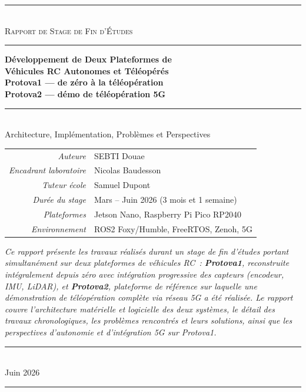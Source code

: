 \documentclass[a4paper,11pt]{article}
\begin{document}
\begin{titlepage}
\thispagestyle{empty}
\begin{center}

\rule{\textwidth}{0.5pt}\\[0.4cm]
{\large\scshape Rapport de Stage de Fin d'Études}\\[0.2cm]
\rule{\textwidth}{0.5pt}

\vspace{2cm}

{\LARGE\bfseries Développement de Deux Plateformes de}\\[0.3cm]
{\LARGE\bfseries Véhicules RC Autonomes et Téléopérés}\\[0.6cm]
{\Large\bfseries Protova1 \textnormal{—} de zéro à la téléopération}\\[0.2cm]
{\Large\bfseries Protova2 \textnormal{—} démo de téléopération 5G}\\[0.4cm]
\rule{0.6\textwidth}{0.3pt}\\[0.4cm]
{\large Architecture, Implémentation, Problèmes et Perspectives}

\vspace{2cm}

\begin{tabular}{rl}
\textit{Auteure}              & SEBTI Douae \\[0.3cm]
\textit{Encadrant laboratoire} & Nicolas Baudesson \\[0.3cm]
\textit{Tuteur école}          & Samuel Dupont \\[0.3cm]
\textit{Durée du stage}        & Mars -- Juin 2026 (3 mois et 1 semaine) \\[0.3cm]
\textit{Plateformes}           & Jetson Nano, Raspberry Pi Pico RP2040 \\[0.3cm]
\textit{Environnement}         & ROS2 Foxy/Humble, FreeRTOS, Zenoh, 5G \\
\end{tabular}

\vspace{1.5cm}

\begin{minipage}{0.88\textwidth}
\small\itshape
Ce rapport présente les travaux réalisés durant un stage de fin d'études portant
simultanément sur deux plateformes de véhicules RC~: \textbf{Protova1}, reconstruite
intégralement depuis zéro avec intégration progressive des capteurs (encodeur, IMU,
LiDAR), et \textbf{Protova2}, plateforme de référence sur laquelle une démonstration de
téléopération complète via réseau 5G a été réalisée. Le rapport couvre l'architecture
matérielle et logicielle des deux systèmes, le détail des travaux chronologiques, les
problèmes rencontrés et leurs solutions, ainsi que les perspectives d'autonomie et
d'intégration 5G sur Protova1.
\end{minipage}

\vfill
\rule{\textwidth}{0.5pt}\\[0.3cm]
{\small Juin 2026}\\
\rule{\textwidth}{0.5pt}
\end{center}
\end{titlepage}
\end{document}
